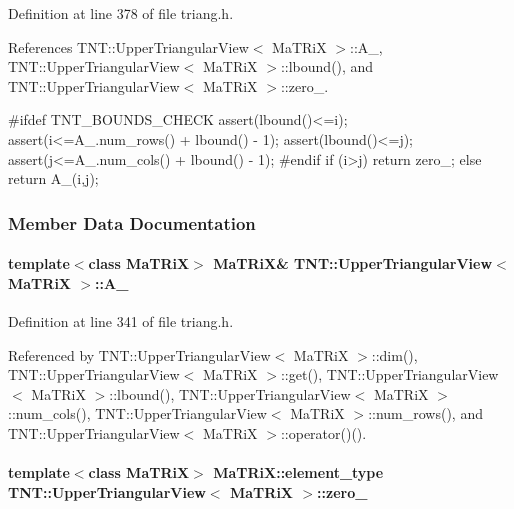 Definition at line 378 of file triang.h.



References TNT::UpperTriangularView$<$ MaTRiX $>$::A\_\-, TNT::UpperTriangularView$<$ MaTRiX $>$::lbound(), and TNT::UpperTriangularView$<$ MaTRiX $>$::zero\_\-.




\begin{DoxyCode}
    {
#ifdef TNT_BOUNDS_CHECK
        assert(lbound()<=i);
        assert(i<=A_.num_rows() + lbound() - 1);
        assert(lbound()<=j);
        assert(j<=A_.num_cols() + lbound() - 1);
#endif
        if (i>j) 
            return zero_;
        else
            return A_(i,j);
    }
\end{DoxyCode}




\subsubsection{Member Data Documentation}
\paragraph[{A\_\-}]{\setlength{\rightskip}{0pt plus 5cm}template$<$class MaTRiX$>$ MaTRiX\& {\bf TNT::UpperTriangularView}$<$ MaTRiX $>$::{\bf A\_\-}}\hfill\label{class_t_n_t_1_1_upper_triangular_view_aaa61bcc4de9b2aa76e2a5e2b6d6e9c00}


Definition at line 341 of file triang.h.



Referenced by TNT::UpperTriangularView$<$ MaTRiX $>$::dim(), TNT::UpperTriangularView$<$ MaTRiX $>$::get(), TNT::UpperTriangularView$<$ MaTRiX $>$::lbound(), TNT::UpperTriangularView$<$ MaTRiX $>$::num\_\-cols(), TNT::UpperTriangularView$<$ MaTRiX $>$::num\_\-rows(), and TNT::UpperTriangularView$<$ MaTRiX $>$::operator()().

\paragraph[{zero\_\-}]{\setlength{\rightskip}{0pt plus 5cm}template$<$class MaTRiX$>$ MaTRiX::element\_\-type {\bf TNT::UpperTriangularView}$<$ MaTRiX $>$::{\bf zero\_\-}}\hfill\label{class_t_n_t_1_1_upper_triangular_view_a149d7f5679ebea3741c653f2a895018b}


